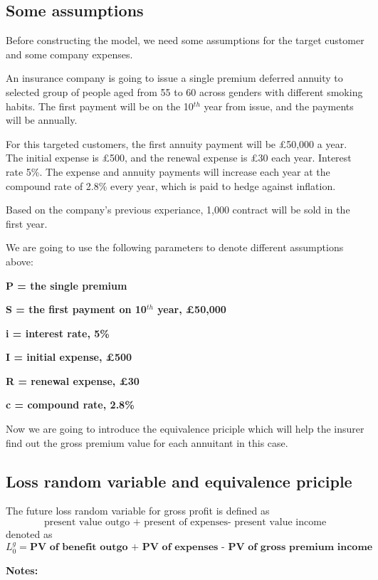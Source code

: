 \documentclass{report}
\begin{document}
\subsection{Some assumptions}

Before constructing the model, we need some assumptions for the target customer and some company expenses.

An insurance company is going to issue a single premium deferred annuity to selected group of people aged from 55 to 60 across genders with different smoking habits. The first payment will be on the 10$^{th}$ year from issue, and the payments will be annually.

For this targeted customers, the first annuity payment will be \pounds 50,000 a year. The initial expense is \pounds500, and the renewal expense is \pounds30 each year. Interest rate 5\%. The expense and annuity payments will increase each year at the compound rate of 2.8\% every year, which is paid to hedge against inflation.

Based on the company's previous experiance, 1,000 contract will be sold in the first year. 

We are going to use the following parameters to denote different assumptions above:

\textbf{P = the single premium}

\textbf{S = the first payment on 10$^{th}$ year, \pounds50,000}

\textbf{i = interest rate, 5\%}

\textbf{I = initial expense, \pounds500}

\textbf{R = renewal expense, \pounds30}

\textbf{c = compound rate, 2.8\%}


Now we are going to introduce the equivalence priciple which will help the insurer find out the gross premium value for each annuitant in this case.



\subsection{Loss random variable and equivalence priciple}

The future loss random variable for gross profit is defined as 
\[
\text{present value outgo + present of expenses- present value income}
\]
denoted as
\[
\textbf{$L_0^g$} = \textbf{PV of benefit outgo + PV of expenses - PV of gross premium income}
\]

\textbf{Notes:}
\end{document}
